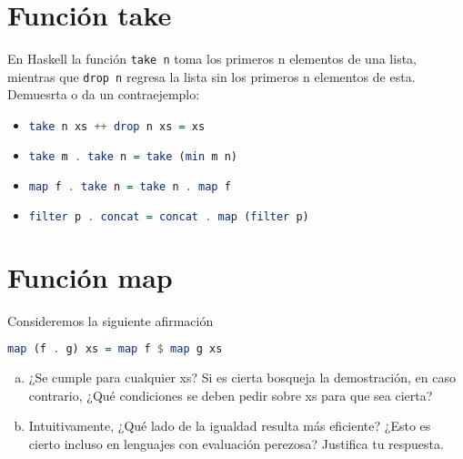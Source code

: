 \documentclass[spanish,12pt,letterpaper]{article}
\begin{document}
\section{Función take}
En Haskell la función \texttt{take n} toma los primeros n elementos de una lista,
mientras que \texttt{drop n} regresa la lista sin los primeros n elementos de
esta. Demuesrta o da un contraejemplo:
\begin{itemize}
\item
  \begin{lstlisting}[language=Haskell]
    take n xs ++ drop n xs = xs
  \end{lstlisting}

\item
  \begin{lstlisting}[language=Haskell]
    take m . take n = take (min m n)
  \end{lstlisting}
  
\item
  \begin{lstlisting}[language=Haskell]
    map f . take n = take n . map f
  \end{lstlisting}
  
\item
  \begin{lstlisting}[language=Haskell]
    filter p . concat = concat . map (filter p)
  \end{lstlisting}
\end{itemize}

\section{Función map}
Consideremos la siguiente afirmación
\begin{lstlisting}[language=Haskell]
  map (f . g) xs = map f $ map g xs
\end{lstlisting}
\begin{enumerate}[(a)]
\item ¿Se cumple para cualquier xs? Si es cierta bosqueja la demostración, en
  caso contrario, ¿Qué condiciones se deben pedir sobre xs para que sea cierta?
\item Intuitivamente, ¿Qué lado de la igualdad resulta más eficiente? ¿Esto es
  cierto incluso en lenguajes con evaluación perezosa? Justifica tu respuesta.
\end{enumerate}
\end{document}
